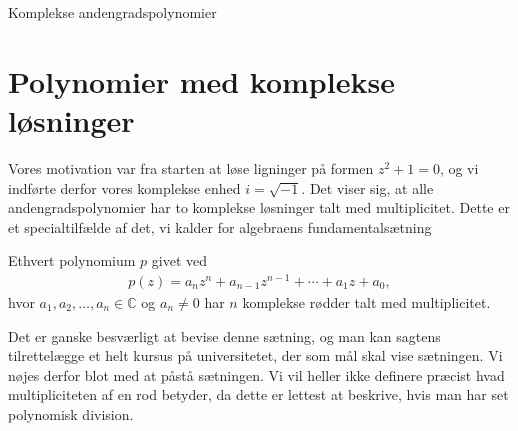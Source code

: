 \begin{center}
\Huge
	Komplekse andengradspolynomier
\end{center}
\section*{Polynomier med komplekse løsninger}

Vores motivation var fra starten at løse ligninger på formen $z^2 + 1 = 0$, og vi indførte derfor vores komplekse enhed $i = \sqrt{-1}$. Det viser sig, at alle andengradspolynomier har to komplekse løsninger talt med multiplicitet. Dette er et specialtilfælde af det, vi kalder for algebraens fundamentalsætning
\begin{setn}
	Ethvert polynomium $p$ givet ved
	\begin{align*}
		p(z) = a_nz^n + a_{n-1}z^{n-1} + \cdots + a_1 z + a_0,
	\end{align*}
	hvor $a_1, a_2, \hdots, a_n \in \mathbb{C}$ og $a_n \neq 0$ har $n$ komplekse rødder talt med multiplicitet. 
\end{setn}
Det er ganske besværligt at bevise denne sætning, og man kan sagtens tilrettelægge et helt kursus på universitetet, der som mål skal vise sætningen. Vi nøjes derfor blot med at påstå sætningen. Vi vil heller ikke definere præcist hvad multipliciteten af en rod betyder, da dette er lettest at beskrive, hvis man har set polynomisk division. 

